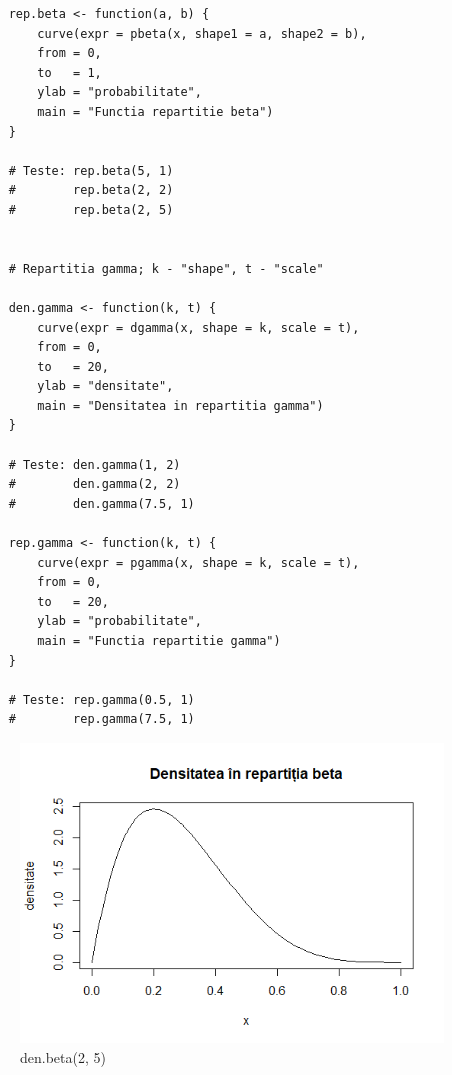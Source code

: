 \documentclass[12pt]{article}
\begin{document}
\begin{lstlisting}
	rep.beta <- function(a, b) {
		curve(expr = pbeta(x, shape1 = a, shape2 = b),
		from = 0,
		to   = 1,
		ylab = "probabilitate",
		main = "Functia repartitie beta")
	}
	
	# Teste: rep.beta(5, 1)
	#        rep.beta(2, 2)
	#        rep.beta(2, 5)
	
	
	# Repartitia gamma; k - "shape", t - "scale"
	
	den.gamma <- function(k, t) {
		curve(expr = dgamma(x, shape = k, scale = t),
		from = 0,
		to   = 20,
		ylab = "densitate",
		main = "Densitatea in repartitia gamma")
	}
	
	# Teste: den.gamma(1, 2)
	#        den.gamma(2, 2)
	#        den.gamma(7.5, 1)
	
	rep.gamma <- function(k, t) {
		curve(expr = pgamma(x, shape = k, scale = t),
		from = 0,
		to   = 20,
		ylab = "probabilitate",
		main = "Functia repartitie gamma")
	}
	
	# Teste: rep.gamma(0.5, 1)
	#        rep.gamma(7.5, 1)
\end{lstlisting}
\begin{figure}[h!]
	\centering
	\includegraphics[scale=0.75]{DenBeta}
	\caption{den.beta(2, 5)}
\end{figure}
\end{document}
